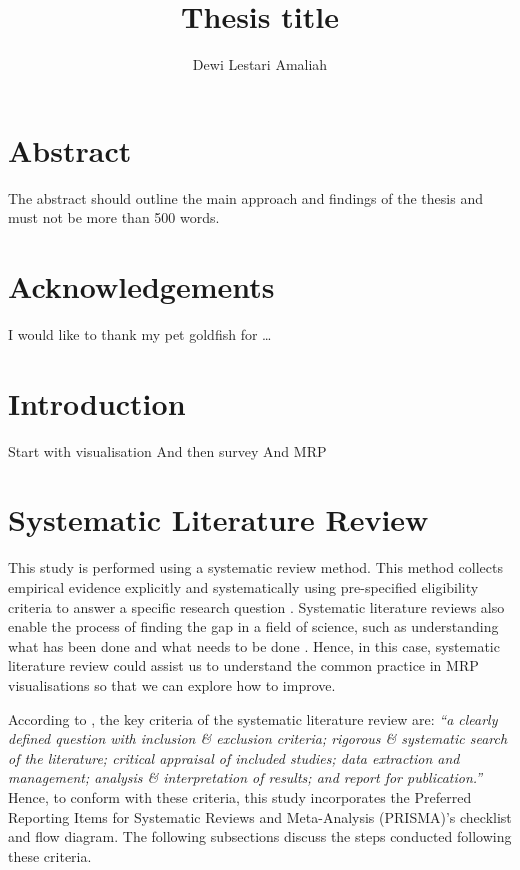 \documentclass{monashthesis}
\author{Dewi Lestari Amaliah}
\title{Thesis title}
\begin{document}

\titlepage

{\sf\tighttoc\doublespacing}

\clearpage{}\setcounter{page}{0}

\hypertarget{abstract}{%
\chapter*{Abstract}\label{abstract}}

The abstract should outline the main approach and findings of the thesis and must not be more than 500 words.

\newpage

\hypertarget{acknowledgements}{%
\chapter*{Acknowledgements}\label{acknowledgements}}

I would like to thank my pet goldfish for \dots

\hypertarget{ch:intro}{%
\chapter{Introduction}\label{ch:intro}}

Start with visualisation
And then survey
And MRP

\hypertarget{sec:syslitrev}{%
\chapter{Systematic Literature Review}\label{sec:syslitrev}}

This study is performed using a systematic review method. This method collects empirical evidence explicitly and systematically using pre-specified eligibility criteria to answer a specific research question \autocite{cochrane}. Systematic literature reviews also enable the process of finding the gap in a field of science, such as understanding what has been done and what needs to be done \autocite{LinnenlueckeMartinaK2020Cslr}. Hence, in this case, systematic literature review could assist us to understand the common practice in MRP visualisations so that we can explore how to improve.

According to \textcite{brown_uni}, the key criteria of the systematic literature review are: \emph{``a clearly defined question with inclusion \& exclusion criteria; rigorous \& systematic search of the literature; critical appraisal of included studies; data extraction and management; analysis \& interpretation of results; and report for publication.''} Hence, to conform with these criteria, this study incorporates the Preferred Reporting Items for Systematic Reviews and Meta-Analysis (PRISMA)'s checklist and flow diagram. The following subsections discuss the steps conducted following these criteria.
\end{document}

